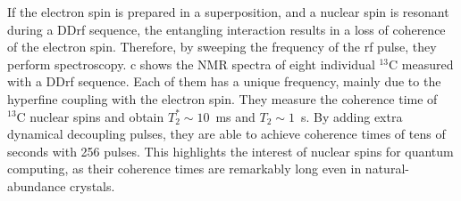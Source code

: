 If the electron spin is prepared in a superposition, and a nuclear spin is resonant during a DDrf sequence, the entangling interaction results in a loss of coherence of the electron spin. Therefore, by sweeping the frequency of the rf pulse, they perform spectroscopy. c shows the NMR spectra of eight individual $^{13}\mathrm{C}$ measured with a DDrf sequence. Each of them has a unique frequency, mainly due to the hyperfine coupling with the electron spin. They measure the coherence time of $^{13}\mathrm{C}$ nuclear spins and obtain $T_2^*\sim10$~ms and $T_2\sim1$~s. By adding extra dynamical decoupling pulses, they are able to achieve coherence times of tens of seconds with 256 pulses. This highlights the interest of nuclear spins for quantum computing, as their coherence times are remarkably long even in natural-abundance crystals.




